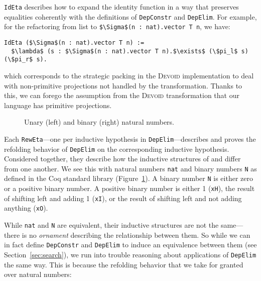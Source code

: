 \lstinline{IdEta} describes how to expand the identity function in a way that preserves equalities
coherently with the definitions of \lstinline{DepConstr} and \lstinline{DepElim}.
For example, for the refactoring from list to \lstinline{$\Sigma$(n : nat).vector T n}, we have:

\begin{lstlisting}
IdEta ($\Sigma$(n : nat).vector T n) :=
  $\lambda$ (s : $\Sigma$(n : nat).vector T n).$\exists$ (\$pi_l$ s) (\$pi_r$ s).
\end{lstlisting}
which corresponds to the strategic packing in the \textsc{Devoid} implementation to deal with
non-primitive projections not handled by the transformation. Thanks to this, we can forego the assumption from the \textsc{Devoid} transformation
that our language has primitive projections.

\begin{figure}
\begin{minipage}{0.48\textwidth}
   
\end{minipage}
\hfill
\begin{minipage}{0.48\textwidth}
   
\end{minipage}
\caption{Unary (left) and binary (right) natural numbers.}
\label{fig:nattobin}
\end{figure}

Each \lstinline{RewEta}---one per inductive hypothesis in \lstinline{DepElim}---describes and proves the refolding behavior
of \lstinline{DepElim} on the corresponding inductive hypothesis.
Considered together, they describe how the inductive structures of \A and \B differ from one another.
We see this with natural numbers \lstinline{nat} and binary numbers \lstinline{N} as defined in the Coq standard library (Figure~\ref{fig:nattobin}).
A binary number \lstinline{N} is either zero or a positive binary number. A positive binary number
is either 1 (\lstinline{xH}), the result of shifting left and adding 1 (\lstinline{xI}),
or the result of shifting left and not adding anything (\lstinline{xO}).

While \lstinline{nat} and \lstinline{N} are equivalent, their inductive structures are not the same---there is no
\textit{ornament} describing the relationship between them. %
So while we can in fact define \lstinline{DepConstr} and \lstinline{DepElim} to induce an equivalence
between them (see Section~\ref{sec:search}), we run into trouble reasoning about applications of \lstinline{DepElim}
the same way. This is because the refolding behavior that we take for granted over natural numbers:

